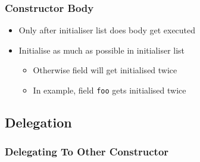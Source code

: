 \begin{frame}
  \frametitle{Constructor Body}
  \begin{itemize}
    \item Only after initialiser list does body get executed
    \item Initialise as much as possible in initialiser list
          \begin{itemize}
            \item Otherwise field will get initialised twice
            \item In example, field \texttt{foo} gets initialised twice
          \end{itemize}
  \end{itemize}
\end{frame}

\subsection{Delegation}
\frame{\tableofcontents[currentsubsection]}

\begin{frame}
  \frametitle{Delegating To Other Constructor}
\end{frame}


